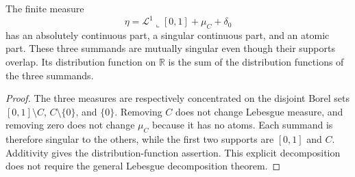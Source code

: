 \begin{example}\label{ex:three-measure-components}
The finite measure
\[
 \eta=\mathcal L^1\llcorner[0,1]+\mu_C+\delta_0
\]
has an absolutely continuous part, a singular continuous part, and an atomic part. These three summands are mutually singular even though their supports overlap. Its distribution function on $\mathbb R$ is the sum of the distribution functions of the three summands.
\end{example}
\begin{proof}
The three measures are respectively concentrated on the disjoint Borel sets $[0,1]\setminus C$, $C\setminus\{0\}$, and $\{0\}$. Removing $C$ does not change Lebesgue measure, and removing zero does not change $\mu_C$ because it has no atoms. Each summand is therefore singular to the others, while the first two supports are $[0,1]$ and $C$. Additivity gives the distribution-function assertion. This explicit decomposition does not require the general Lebesgue decomposition theorem.
\end{proof}
